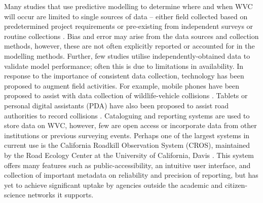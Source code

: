 Many studies that use predictive modelling to determine where and when WVC will occur are limited to single sources of data -- either field collected based on predetermined project requirements \citep[e.g.][]{lang09,roge09} or pre-existing from independent surveys or routine collections \citep[e.g.][]{hoth12,malo04}. Bias and error may arise from the data sources and collection methods, however, these are not often explicitly reported or accounted for in the modelling methods. Further, few studies utilise independently-obtained data to validate model performance; often this is due to limitations in availability. In response to the importance of consistent data collection, technology has been proposed to augment field activities. For example, mobile phones have been proposed to assist with data collection of wildlife-vehicle collisions \citep{aane09,olso14}. Tablets or personal digital assistants (PDA) have also been proposed to assist road authorities to record collisions \citep{amen07}. Cataloguing and reporting systems are used to store data on WVC, however, few are open access or incorporate data from other institutions or previous surveying events. Perhaps one of the largest systems in current use is the California Roadkill Observation System (CROS), maintained by the Road Ecology Center at the University of California, Davis \citep{shil15b}. This system offers many features such as public-accessibility, an intuitive user interface, and collection of important metadata on reliability and precision of reporting, but has yet to achieve significant uptake by agencies outside the academic and citizen-science networks it supports.


